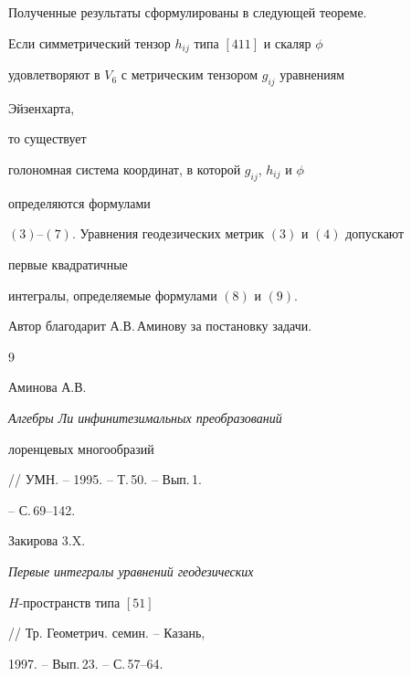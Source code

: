 Полученные результаты сформулированы в следующей теореме. 


 


\begin{thmnonum} 


Если симметрический тензор $h_{ij}$ типа $[411]$ и скаляр $\phi$ 


удовлетворяют в $V_6$ с метрическим тензором $g_{ij}$ уравнениям 


Эйзенхарта, 


то существует  


голономная система координат, в которой $g_{ij}$, $h_{ij}$ и $\phi$ 


определяются формулами  


$(3)$--$(7)$. Уравнения геодезических метрик $(3)$ и $(4)$ допускают 


первые квадратичные  


интегралы, определяемые формулами $(8)$ и $(9)$. 


\end{thmnonum} 


 


Автор благодарит А.В.\,Аминову за постановку задачи. 


 


\begin{thebibliography}{9} 


 




Аминова А.В. {\em Алгебры Ли инфинитезимальных преобразований  


лоренцевых многообразий}\linebreak // УМН. -- 1995. -- Т.\,50. -- Вып.\,1. 


-- С.\,69--142. 




Закирова 3.X. {\em Первые интегралы уравнений геодезических 


$H$-пространств типа $[51]$} // Тр. Геометрич. семин. -- Казань, 


1997. -- Вып.\,23. -- С.\,57--64. 


 


\end{thebibliography} 


 


\vskip 0.5cm 


 








\label{end} 


 



